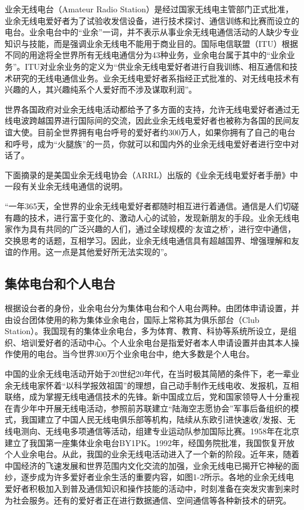 \documentclass[12pt,UTF8]{ctexbook}
\begin{document}
业余无线电台（Amateur Radio Station）是经过国家无线电主管部门正式批准，业余无线电爱好者为了试验收发信设备，进行技术探讨、通信训练和比赛而设立的电台。业余电台中的“业余”一词，并不表示从事业余无线电通信活动的人缺少专业知识与技能，而是强调业余无线电不能用于商业目的。国际电信联盟（ITU）根据不同的用途将全世界所有无线电通信分为43种业务，业余电台属于其中的“业余业务”。ITU对业余业务的定义为“供业余无线电爱好者进行自我训练、相互通信和技术研究的无线电通信业务。业余无线电爱好者系指经正式批准的、对无线电技术有兴趣的人，其兴趣纯系个人爱好而不涉及谋取利润”。

世界各国政府对业余无线电活动都给予了多方面的支持，允许无线电爱好者通过无线电波跨越国界进行国际间的交流，因此业余无线电爱好者也被称为各国的民间友谊大使。目前全世界拥有电台呼号的爱好者约300万人，如果你拥有了自己的电台和呼号，成为“火腿族”的一员，你就可以和国内外的业余无线电爱好者进行空中对话了。

下面摘录的是美国业余无线电协会（ARRL）出版的《业余无线电爱好者手册》中一段有关业余无线电通信的说明。

“一年365天，全世界的业余无线电爱好者都随时相互进行着通信。通信是人们切磋有趣的技术，进行富于变化的、激动人心的试验，发现新朋友的手段。业余无线电家作为具有共同的广泛兴趣的人们，通过全球规模的‘友谊之桥’，进行空中通信，交换思考的话题，互相学习。因此，业余无线电通信具有超越国界、增强理解和友谊的作用。这一点是其他爱好所无法实现的”。

\subsection{集体电台和个人电台}

根据设台者的身份，业余电台分为集体电台和个人电台两种。由团体申请设置，并由设台团体使用的称为集体业余电台，国际上常称其为俱乐部台（Club Station）。我国现有的集体业余电台，多为体育、教育、科协等系统所设立，是组织、培训爱好者的活动中心。个人业余电台是指爱好者本人申请设置并由其本人操作使用的电台。当今世界300万个业余电台中，绝大多数是个人电台。

中国的业余无线电活动开始于20世纪20年代，在当时极其简陋的条件下，老一辈业余无线电家怀着“以科学报效祖国”的理想，自己动手制作无线电收、发报机，互相联络，成为掌握无线电通信技术的先锋。新中国成立后，党和国家领导人十分重视在青少年中开展无线电活动，参照前苏联建立“陆海空志愿协会”军事后备组织的模式，我国建立了中国人民无线电俱乐部等机构，陆续从东欧引进快速收/发报、无线电测向、无线电多项通信等活动，组建专业运动队参加国际比赛。1958年在北京建立了我国第一座集体业余电台BY1PK。1992年，经国务院批准，我国恢复开放个人业余电台。从此，我国的业余无线电活动进入了一个新的阶段。近年来，随着中国经济的飞速发展和世界范围内文化交流的加强，业余无线电已揭开它神秘的面纱，逐步成为许多爱好者业余生活的重要内容，如图1-2所示。各地的业余无线电爱好者积极加入到普及通信知识和操作技能的活动中，时刻准备在突发灾害到来时为社会服务。还有的爱好者正在进行数据通信、空间通信等各种新技术的研究。
\end{document}
